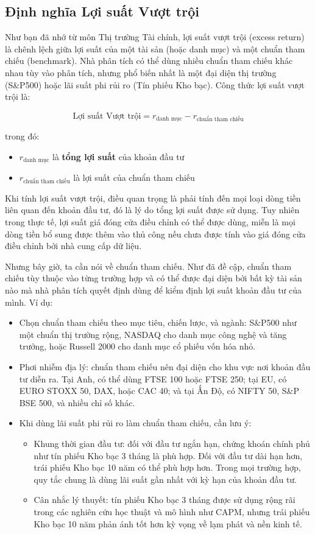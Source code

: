 \subsection{Định nghĩa Lợi suất Vượt trội}

Như bạn đã nhớ từ môn Thị trường Tài chính, lợi suất vượt trội (excess return) là chênh lệch giữa lợi suất của một tài sản (hoặc danh mục) và một chuẩn tham chiếu (benchmark). Nhà phân tích có thể dùng nhiều chuẩn tham chiếu khác nhau tùy vào phân tích, nhưng phổ biến nhất là một đại diện thị trường (S\&P500) hoặc lãi suất phi rủi ro (Tín phiếu Kho bạc). Công thức lợi suất vượt trội là:

$$
\text{Lợi suất Vượt trội} = r_{\text{danh mục}} - r_{\text{chuẩn tham chiếu}}
$$

trong đó:
\begin{itemize}
  \item $r_{\text{danh mục}}$ là \textbf{tổng lợi suất} của khoản đầu tư
  \item $r_{\text{chuẩn tham chiếu}}$ là lợi suất của chuẩn tham chiếu
\end{itemize}

Khi tính lợi suất vượt trội, điều quan trọng là phải tính đến mọi loại dòng tiền liên quan đến khoản đầu tư, đó là lý do tổng lợi suất được sử dụng. Tuy nhiên trong thực tế, lợi suất giá đóng cửa điều chỉnh có thể được dùng, miễn là mọi dòng tiền bổ sung được thêm vào thủ công nếu chưa được tính vào giá đóng cửa điều chỉnh bởi nhà cung cấp dữ liệu.

Nhưng bây giờ, ta cần nói về chuẩn tham chiếu. Như đã đề cập, chuẩn tham chiếu tùy thuộc vào từng trường hợp và có thể được đại diện bởi bất kỳ tài sản nào mà nhà phân tích quyết định dùng để kiểm định lợi suất khoản đầu tư của mình. Ví dụ:

\begin{itemize}
  \item Chọn chuẩn tham chiếu theo mục tiêu, chiến lược, và ngành: S\&P500 như một chuẩn thị trường rộng, NASDAQ cho danh mục công nghệ và tăng trưởng, hoặc Russell 2000 cho danh mục cổ phiếu vốn hóa nhỏ.
  \item Phơi nhiễm địa lý: chuẩn tham chiếu nên đại diện cho khu vực nơi khoản đầu tư diễn ra. Tại Anh, có thể dùng FTSE 100 hoặc FTSE 250; tại EU, có EURO STOXX 50, DAX, hoặc CAC 40; và tại Ấn Độ, có NIFTY 50, S\&P BSE 500, và nhiều chỉ số khác.
  \item Khi dùng lãi suất phi rủi ro làm chuẩn tham chiếu, cần lưu ý:
  \begin{itemize}
    \item Khung thời gian đầu tư: đối với đầu tư ngắn hạn, chứng khoán chính phủ như tín phiếu Kho bạc 3 tháng là phù hợp. Đối với đầu tư dài hạn hơn, trái phiếu Kho bạc 10 năm có thể phù hợp hơn. Trong mọi trường hợp, quy tắc chung là dùng lãi suất gần nhất với kỳ hạn của khoản đầu tư.
    \item Cân nhắc lý thuyết: tín phiếu Kho bạc 3 tháng được sử dụng rộng rãi trong các nghiên cứu học thuật và mô hình như CAPM, nhưng trái phiếu Kho bạc 10 năm phản ánh tốt hơn kỳ vọng về lạm phát và nền kinh tế.
  \end{itemize}
\end{itemize}

